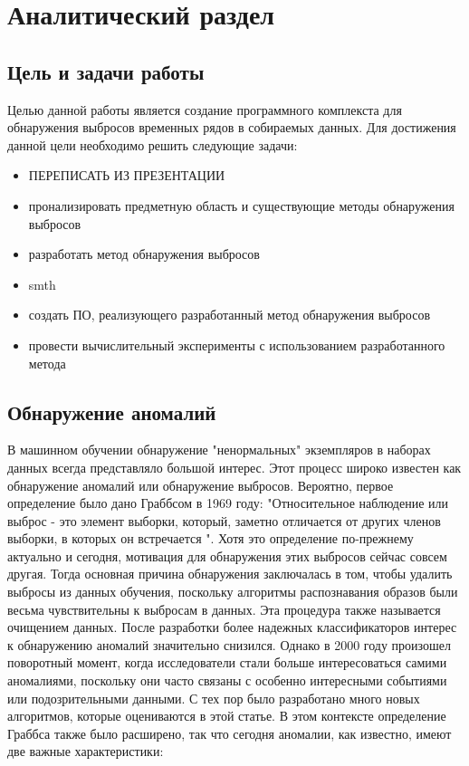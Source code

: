 \chapter{Аналитический раздел}
\label{cha:analysis}
\section{Цель и задачи работы}
Целью данной работы является создание программного комплекста для обнаружения выбросов временных рядов в собираемых данных.
Для достижения данной цели необходимо решить следующие задачи:
\begin{itemize}
	\item ПЕРЕПИСАТЬ ИЗ ПРЕЗЕНТАЦИИ
	\item пронализировать предметную область и существующие методы обнаружения выбросов
	\item разработать метод обнаружения выбросов
	\item smth
	\item создать ПО, реализующего  разработанный метод обнаружения выбросов
	\item провести вычислительный эксперименты с использованием разработанного метода
	
\end{itemize}
\section{Обнаружение аномалий}
В машинном обучении обнаружение  "ненормальных" экземпляров в наборах данных всегда представляло большой интерес. Этот процесс широко известен как обнаружение аномалий или обнаружение выбросов.  Вероятно, первое определение было дано Граббсом\cite{Book02} в 1969 году: "Относительное наблюдение или выброс - это элемент выборки, который, заметно отличается от других членов выборки, в которых он встречается ".
Хотя это определение по-прежнему актуально и сегодня, мотивация для обнаружения этих выбросов сейчас совсем другая. Тогда основная причина обнаружения заключалась в том, чтобы удалить выбросы из данных обучения, поскольку алгоритмы распознавания образов были весьма чувствительны к выбросам в данных. Эта процедура также называется очищением данных. После разработки более надежных классификаторов интерес к обнаружению аномалий значительно снизился. Однако в 2000 году произошел поворотный момент, когда исследователи стали больше интересоваться самими аномалиями, поскольку они часто связаны с особенно интересными событиями или подозрительными данными. С тех пор было разработано много новых алгоритмов, которые оцениваются в этой статье. В этом контексте определение Граббса также было расширено, так что сегодня аномалии, как известно, имеют две важные характеристики:
